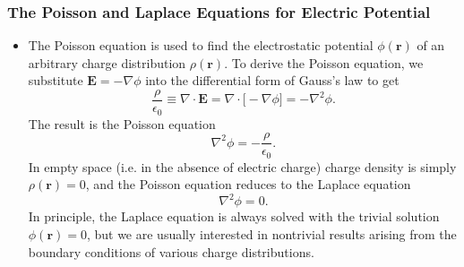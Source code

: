 \documentclass[11pt, a4paper]{article}
\renewcommand{\vec}[1]{\bm{#1}} %
\renewcommand{\r}{\vec{r}}
\newcommand{\E}{\vec{E}} %
\newcommand{\ee}{\epsilon_{0}}  %
\renewcommand{\div}{\nabla \cdot}
\renewcommand{\grad}{\nabla}
\renewcommand{\laplacian}{\nabla^{2}}
\begin{document}
\subsubsection{The Poisson and Laplace Equations for Electric Potential}
\begin{itemize}
	\item The Poisson equation is used to find the electrostatic potential $ \phi(\r) $ of an arbitrary charge distribution $ \rho(\r) $. To derive the Poisson equation, we substitute $ \E = - \grad \phi $ into the differential form of Gauss's law to get
	\begin{equation*}
		\frac{\rho}{\ee} \equiv \div \E = \div \big[- \grad \phi \big]= - \laplacian \phi.
	\end{equation*}
	The result is the Poisson equation
	\begin{equation*}
		\laplacian \phi = - \frac{\rho}{\ee}.
	\end{equation*}
	In empty space (i.e. in the absence of electric charge) charge density is simply $ \rho(\r) = 0 $, and the Poisson equation reduces to the Laplace equation
	\begin{equation*}
		\laplacian \phi = 0.
	\end{equation*}
	In principle, the Laplace equation is always solved with the trivial solution $ \phi(\r) = 0 $, but we are usually interested in nontrivial results arising from the boundary conditions of various charge distributions. 
\end{itemize}
\end{document}
